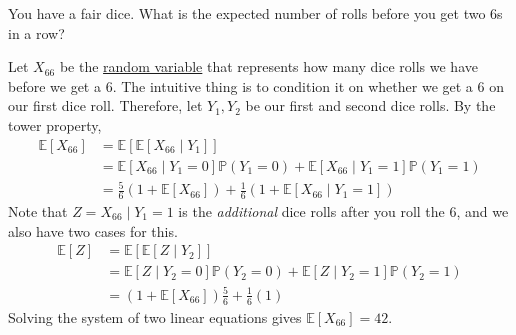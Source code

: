 	\begin{exercise}
	  \label{ex:expected-number-of-rolls-before-getting-two-6s}
		You have a fair dice. What is the expected number of rolls before you get two 6s in a row? 
	\end{exercise}
	\begin{solution}
		Let $X_{66}$ be the \hyperref[def:random-variable]{random variable} that represents how many dice rolls we have before we get a $6$. The intuitive thing is to condition it on whether we get a 6 on our first dice roll. Therefore, let $Y_1, Y_2$ be our first and second dice rolls. By the tower property, 
		\begin{align}
			\mathbb{E}[X_{66}] & = \mathbb{E}[ \mathbb{E}[X_{66} \mid Y_1]] \\ 
												 & = \mathbb{E}[X_{66} \mid Y_1 = 0] \mathbb{P}(Y_1 = 0) + \mathbb{E}[X_{66} \mid Y_1 = 1] \mathbb{P}(Y_1 = 1) \\ 
												 & = \frac{5}{6} (1 + \mathbb{E}[X_66]) + \frac{1}{6} (1 + \mathbb{E}[X_{66} \mid Y_1 = 1])
		\end{align}
		Note that $Z = X_{66} \mid Y_1 = 1$ is the \textit{additional} dice rolls after you roll the $6$, and we also have two cases for this. 
		\begin{align}
			\mathbb{E}[Z] & = \mathbb{E}[\mathbb{E}[Z \mid Y_2]] \\ 
										& = \mathbb{E}[Z \mid Y_2 = 0] \mathbb{P}(Y_2 = 0) + \mathbb{E}[Z \mid Y_2 = 1] \mathbb{P}(Y_2 = 1) \\ 
										& = (1 + \mathbb{E}[X_{66}]) \frac{5}{6} + \frac{1}{6} (1)
		\end{align}
		Solving the system of two linear equations gives $\mathbb{E}[X_{66}] = 42$. 
	\end{solution}

